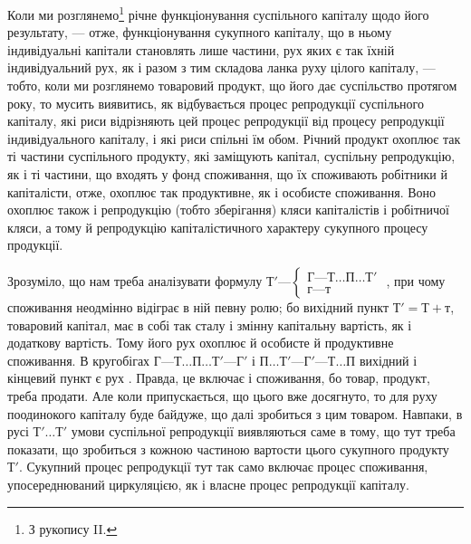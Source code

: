 Коли ми розглянемо\footnote{
З рукопису II.
} річне функціонування суспільного капіталу щодо
його результату, — отже, функціонування сукупного капіталу, що в ньому
індивідуальні капітали становлять лише частини, рух яких є так їхній
індивідуальний рух, як і разом з тим складова ланка руху цілого капіталу,
— тобто, коли ми розглянемо товаровий продукт, що його дає суспільство
протягом року, то мусить виявитись, як відбувається процес
репродукції суспільного капіталу, які риси відрізняють цей процес репродукції
від процесу репродукції індивідуального капіталу, і які риси
спільні їм обом. Річний продукт охоплює так ті частини суспільного
продукту, які заміщують капітал, суспільну репродукцію, як і ті частини,
що входять у фонд споживання, що їх споживають робітники й капіталісти,
отже, охоплює так продуктивне, як і особисте споживання. Воно
охоплює також і репродукцію (тобто зберігання) кляси капіталістів і
робітничої кляси, а тому й репродукцію капіталістичного характеру сукупного
процесу продукції.

Зрозуміло, що нам треба аналізувати формулу 
$Т' — \left\{
  \begin{array}{c}
    Г — Т\dots{} П\dots{} Т'\\
    г — т
  \end{array}
\right.$
, при чому споживання неодмінно відіграє в ній
певну ролю; бо вихідний пункт $Т' = Т + т$, товаровий капітал, має в
собі так сталу і змінну капітальну вартість, як і додаткову вартість.
Тому його рух охоплює й особисте й продуктивне споживання. В кругобігах
$Г — Т\dots{} П\dots{} Т' — Г'$ і $П\dots{} Т' — Г' — Т\dots{} П$ вихідний і кінцевий
пункт є рух . Правда, це включає і споживання, бо товар,
продукт, треба продати. Але коли припускається, що цього вже досягнуто,
то для руху поодинокого капіталу буде байдуже, що далі зробиться
з цим товаром. Навпаки, в русі $Т'\dots{} Т'$ умови суспільної репродукції
виявляються саме в тому, що тут треба показати, що зробиться з кожною
частиною вартости цього сукупного продукту $Т'$. Сукупний процес
репродукції тут так само включає процес споживання, упосереднюваний
циркуляцією, як і власне процес репродукції капіталу.

